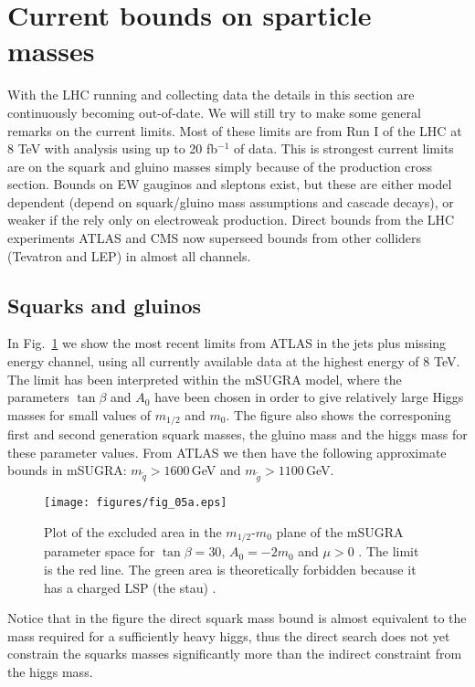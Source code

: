 \documentclass[notes.tex]{subfiles}
\begin{document}
\section{Current bounds on sparticle masses}
With the LHC running and collecting data the details in this section are continuously becoming out-of-date. We will still try to make some general remarks on the current limits. Most of these limits are from Run I of the LHC at 8 TeV with analysis using up to 20 fb$^{-1}$ of data. This is strongest current limits are on the squark and gluino masses simply because of the production cross section. Bounds on EW gauginos and sleptons exist, but these are either model dependent (depend on squark/gluino mass assumptions and cascade decays), or weaker if the rely only on electroweak production. Direct bounds from the LHC experiments ATLAS and CMS now superseed  bounds from other colliders (Tevatron and LEP) in almost all channels.

\subsection{Squarks and gluinos}
In Fig.~\ref{squarkgluinolimit} we show the most recent limits from ATLAS in the jets plus missing energy channel, using all currently available data at the highest energy of 8 TeV. The limit has been interpreted within the mSUGRA model, where the parameters $\tan\beta$ and $A_0$ have been chosen in order to give relatively large Higgs masses for small values of $m_{1/2}$ and $m_0$. The figure also shows the corresponing first and second generation squark masses, the gluino mass and the higgs mass for these parameter values. From ATLAS we then have the following approximate bounds in mSUGRA: $m_{\tilde{q}}>1600$\,GeV and $m_{\tilde{g}}> 1100$\,GeV.

\begin{figure}[h!]
\begin{center}
\texttt{[image: figures/fig\_05a.eps]} 
\caption{Plot of the excluded area in the $m_{1/2}$-$m_0$ plane of the mSUGRA parameter space for $\tan\beta=30$, $A_0=-2m_0$ and $\mu >0$ . The limit is the red line. The green area is theoretically forbidden because it has a charged LSP (the stau) \cite{ATLAS-CONF-2013-047}.\label{squarkgluinolimit}}
\end{center}
\end{figure}

Notice that in the figure the direct squark mass bound is almost equivalent to the mass required for a sufficiently heavy higgs, thus the direct search does not yet constrain the squarks masses significantly  more than the indirect constraint from the higgs mass. 
\end{document}
